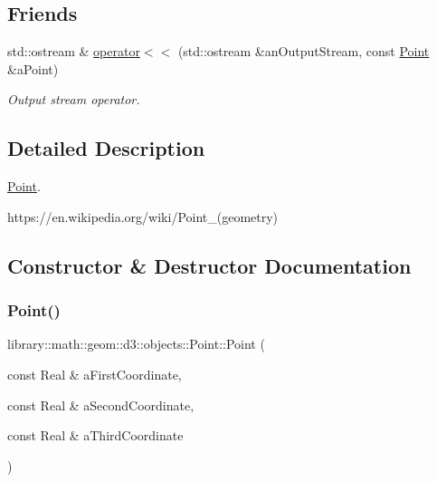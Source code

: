 \subsection*{Friends}
\begin{DoxyCompactItemize}
\item 
std\+::ostream \& \hyperlink{classlibrary_1_1math_1_1geom_1_1d3_1_1objects_1_1_point_ac6c8450721254f3cefdea7dcdd5f5001}{operator$<$$<$} (std\+::ostream \&an\+Output\+Stream, const \hyperlink{classlibrary_1_1math_1_1geom_1_1d3_1_1objects_1_1_point}{Point} \&a\+Point)
\begin{DoxyCompactList}\small\item\em Output stream operator. \end{DoxyCompactList}\end{DoxyCompactItemize}


\subsection{Detailed Description}
\hyperlink{classlibrary_1_1math_1_1geom_1_1d3_1_1objects_1_1_point}{Point}. 

https\+://en.wikipedia.\+org/wiki/\+Point\+\_\+(geometry) 

\subsection{Constructor \& Destructor Documentation}
\mbox{\label{classlibrary_1_1math_1_1geom_1_1d3_1_1objects_1_1_point_a617e690ab6091af3de729cee337e309e}} 
\subsubsection{\texorpdfstring{Point()}{Point()}\hspace{0.1cm}{\footnotesize\ttfamily [1/2]}}
{\footnotesize\ttfamily library\+::math\+::geom\+::d3\+::objects\+::\+Point\+::\+Point (\begin{DoxyParamCaption}\item[{const Real \&}]{a\+First\+Coordinate,  }\item[{const Real \&}]{a\+Second\+Coordinate,  }\item[{const Real \&}]{a\+Third\+Coordinate }\end{DoxyParamCaption})}



